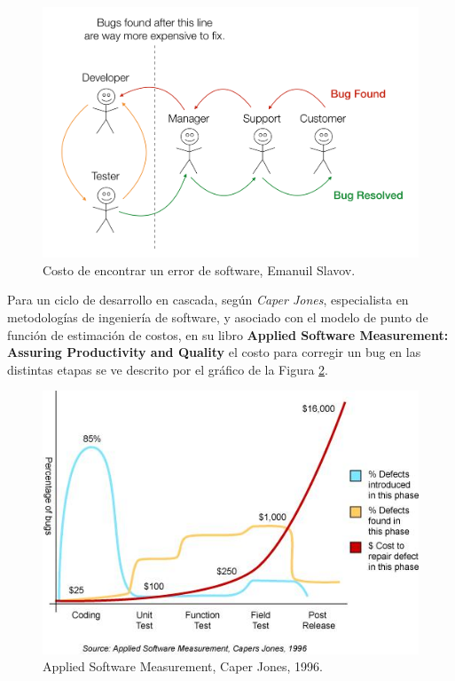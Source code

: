 \begin{figure}[ht]
    \centering
    \includegraphics[scale=0.5]{images/the_cost_of_a_defect.png}
    \caption{Costo de encontrar un error de software, Emanuil Slavov.}
    \label{fig:cost of a defect}
\end{figure}

Para un ciclo de desarrollo en cascada, según \textit{Caper Jones}, especialista en metodologías de ingeniería de software, y asociado con el modelo de punto de función de estimación de costos, en su libro \textbf{Applied Software Measurement: Assuring Productivity and Quality}\cite{jones2008applied} el costo para corregir un bug en las distintas etapas se ve descrito por el gráfico de la Figura \ref{fig:applied cost measurement}.\\

\begin{figure}[ht]
    \centering
    \includegraphics[scale=0.6]{images/AppliedSoftwareMeasurement.png}
    \caption{Applied Software Measurement, Caper Jones, 1996.}
    \label{fig:applied cost measurement}
\end{figure}

